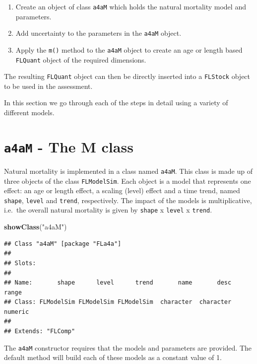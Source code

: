 \documentclass[
]{book}
\newenvironment{Shaded}{\begin{snugshade}}{\end{snugshade}}
\newcommand{\FunctionTok}[1]{\textcolor[rgb]{0.13,0.29,0.53}{\textbf{#1}}}
\newcommand{\NormalTok}[1]{#1}
\newcommand{\StringTok}[1]{\textcolor[rgb]{0.31,0.60,0.02}{#1}}
\providecommand{\tightlist}{%
  \setlength{\itemsep}{0pt}\setlength{\parskip}{0pt}}
\begin{document}
\begin{enumerate}
\def\labelenumi{\arabic{enumi}.}
\tightlist
\item
  Create an object of class \texttt{a4aM} which holds the natural mortality model and parameters.
\item
  Add uncertainty to the parameters in the \texttt{a4aM} object.
\item
  Apply the \texttt{m()} method to the \texttt{a4aM} object to create an age or length based \texttt{FLQuant} object of the required dimensions.
\end{enumerate}

The resulting \texttt{FLQuant} object can then be directly inserted into a \texttt{FLStock} object to be used in the assessment.

In this section we go through each of the steps in detail using a variety of different models.

\hypertarget{a4am---the-m-class}{%
\section{\texorpdfstring{\texttt{a4aM} - The M class}{a4aM - The M class}}\label{a4am---the-m-class}}

Natural mortality is implemented in a class named \texttt{a4aM}. This class is made up of three objects of the class \texttt{FLModelSim}. Each object is a model that represents one effect: an age or length effect, a scaling (level) effect and a time trend, named \texttt{shape}, \texttt{level} and \texttt{trend}, respectively. The impact of the models is multiplicative, i.e.~the overall natural mortality is given by \texttt{shape} x \texttt{level} x \texttt{trend}.

\begin{Shaded}
\begin{Highlighting}[]
\FunctionTok{showClass}\NormalTok{(}\StringTok{"a4aM"}\NormalTok{)}
\end{Highlighting}
\end{Shaded}

\begin{verbatim}
## Class "a4aM" [package "FLa4a"]
## 
## Slots:
##                                                                         
## Name:       shape      level      trend       name       desc      range
## Class: FLModelSim FLModelSim FLModelSim  character  character    numeric
## 
## Extends: "FLComp"
\end{verbatim}

The \texttt{a4aM} constructor requires that the models and parameters are provided. The default method will build each of these models as a constant value of 1.
\end{document}
